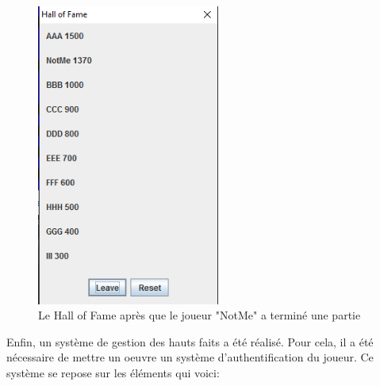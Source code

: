 \documentclass[12pt, openany]{report}
\begin{document}
\begin{figure}[h]
	\centering
	\includegraphics[width=6cm]{Images/HoF.png}
	\caption{\label{hof} Le Hall of Fame après que le joueur "NotMe" a terminé une partie}
\end{figure}


Enfin, un système de gestion des hauts faits a été réalisé. Pour cela, il a été nécessaire de mettre un oeuvre un système d'authentification du joueur.
Ce système se repose sur les éléments qui voici:
\end{document}
